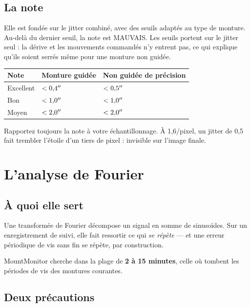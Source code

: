 \section{La note}

Elle est fondée sur le jitter combiné, avec des seuils adaptés au type de
monture. Au-delà du dernier seuil, la note est MAUVAIS. Les seuils portent sur
le jitter seul : la dérive et les mouvements commandés n'y entrent pas, ce qui
explique qu'ils soient serrés même pour une monture non guidée.

\begin{center}
\begin{tabularx}{\textwidth}{lXX}
\toprule
\textbf{Note} & \textbf{Monture guidée} & \textbf{Non guidée de précision} \\
\midrule
Excellent & $< 0{,}4^{\prime\prime}$ & $< 0{,}5^{\prime\prime}$ \\
Bon       & $< 1{,}0^{\prime\prime}$ & $< 1{,}0^{\prime\prime}$ \\
Moyen     & $< 2{,}0^{\prime\prime}$ & $< 2{,}0^{\prime\prime}$ \\
\bottomrule
\end{tabularx}
\end{center}

\begin{tip}
Rapportez toujours la note à votre échantillonnage. À 1,6\arcsec/pixel, un
jitter de 0,5\arcsec{} fait trembler l'étoile d'un tiers de pixel : invisible
sur l'image finale.
\end{tip}

\chapter{L'analyse de Fourier}
\label{ch:fft}

\section{À quoi elle sert}

Une transformée de Fourier décompose un signal en somme de sinusoïdes. Sur un
enregistrement de suivi, elle fait ressortir ce qui \emph{se répète} --- et une
erreur périodique de vis sans fin se répète, par construction.

MountMonitor cherche dans la plage de \textbf{2 à 15 minutes}, celle où tombent
les périodes de vis des montures courantes.

\section{Deux précautions}

